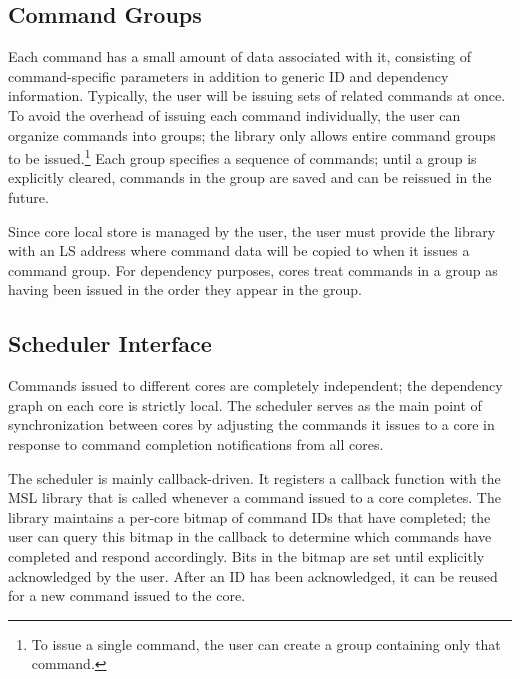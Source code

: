 \subsection{Command Groups}

Each command has a small amount of data associated with it, consisting
of command-specific parameters in addition to generic ID and
dependency information. Typically, the user will be issuing sets of
related commands at once. To avoid the overhead of issuing each
command individually, the user can organize commands into groups; the
library only allows entire command groups to be issued.\footnote{To
issue a single command, the user can create a group containing only
that command.} Each group specifies a sequence of commands; until a
group is explicitly cleared, commands in the group are saved and can
be reissued in the future.

Since core local store is managed by the user, the user must provide
the library with an LS address where command data will be copied to
when it issues a command group. For dependency purposes, cores treat
commands in a group as having been issued in the order they appear in
the group. 

\subsection{Scheduler Interface}

Commands issued to different cores are completely independent; the
dependency graph on each core is strictly local. The scheduler serves
as the main point of synchronization between cores by adjusting the
commands it issues to a core in response to command completion
notifications from all cores.

The scheduler is mainly callback-driven. It registers a callback
function with the MSL library that is called whenever a command issued
to a core completes. The library maintains a per-core bitmap of
command IDs that have completed; the user can query this bitmap in the
callback to determine which commands have completed and respond
accordingly. Bits in the bitmap are set until explicitly acknowledged
by the user. After an ID has been acknowledged, it can be reused for
a new command issued to the core.



